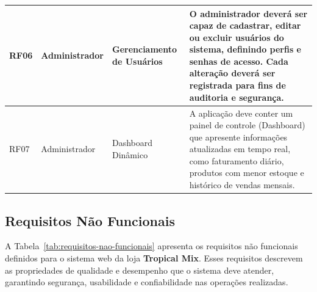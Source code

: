 \begin{table}[H]
\begin{tabular}{|p{2cm}|p{3cm}|p{3.5cm}|p{7cm}|}
RF06 & Administrador & Gerenciamento de Usuários & O administrador deverá ser capaz de cadastrar, editar ou excluir usuários do sistema, definindo perfis e senhas de acesso. Cada alteração deverá ser registrada para fins de auditoria e segurança. \\ \hline
RF07 & Administrador & Dashboard Dinâmico & A aplicação deve conter um painel de controle (Dashboard) que apresente informações atualizadas em tempo real, como faturamento diário, produtos com menor estoque e histórico de vendas mensais. \\ \hline
\end{tabular}
\end{table}

\vspace{-0.5cm}

\subsection{Requisitos Não Funcionais}

A Tabela~\ref{tab:requisitos-nao-funcionais} apresenta os requisitos não funcionais definidos para o sistema web da loja \textbf{Tropical Mix}. Esses requisitos descrevem as propriedades de qualidade e desempenho que o sistema deve atender, garantindo segurança, usabilidade e confiabilidade nas operações realizadas.


